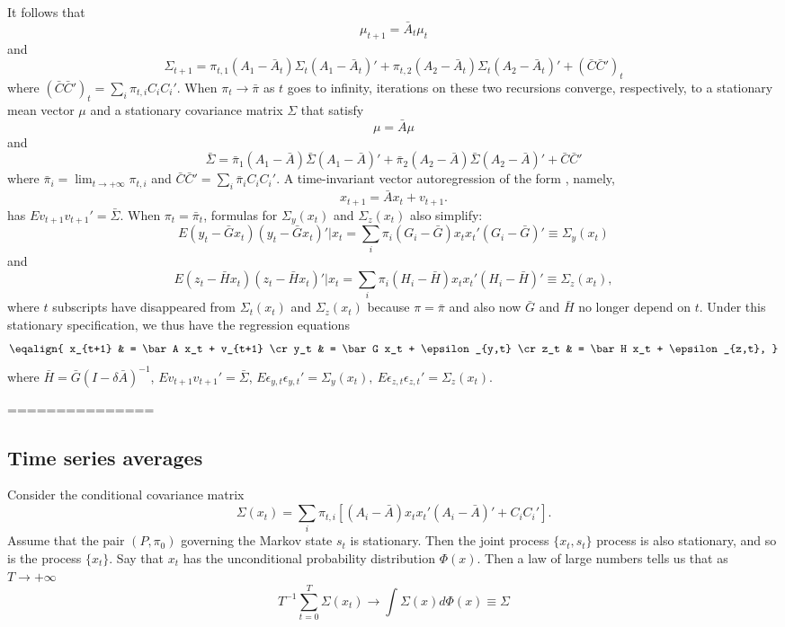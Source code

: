 It follows that
$$ \mu_{t+1} = \bar A_t \mu_t$$
and
$$\Sigma_{t+1} = \pi_{t,1} (A_1 - \bar A_t) \Sigma_t (A_1 - \bar A_t)' + \pi_{t,2} (A_2 - \bar A_t) \Sigma_t (A_2 - \bar A_t)' + (\bar C \bar C')_t  $$
where $(\bar C \bar C')_t = \sum_i \pi_{t,i} C_i C_i' $.
When  $\pi_t \rightarrow \bar \pi$ as $t$ goes to infinity, iterations on these two recursions  converge, respectively, to
a stationary mean vector $\mu$  and a stationary covariance matrix $\Sigma$ that
satisfy
$$ \mu  = \bar A \mu $$
and
$$\bar \Sigma =  \bar \pi_1 (A_1 - \bar A) \bar \Sigma (A_1 - \bar A)' + \bar \pi_2 (A_2 - \bar A) \bar \Sigma(A_2 - \bar A)' + \bar C \bar C' $$
where $\bar \pi_i = \lim_{t \rightarrow +\infty} \pi_{t,i}$ and $\bar C \bar C' = \sum_i \bar \pi_i C_i C_i'$.
A time-invariant vector autoregression of the form , namely,
$$ x_{t+1} = \bar A x_t + v_{t+1} .$$
has $E v_{t+1} v_{t+1}' = \bar \Sigma$.
When $\pi_t = \bar \pi_t$, formulas for $\Sigma_y(x_t)$ and $\Sigma_z(x_t)$ also  simplify: 
$$ E (y_t - \bar G x_t) (y_t - \bar G x_t)' | x_t = \sum_i \pi_{i} 
(G_i - \bar G) x_t x_t' (G_i - \bar G)' \equiv \Sigma_{y}(x_t)   $$
and 
$$ E (z_t - \bar H x_t) (z_t - \bar H x_t)' | x_t = \sum_i \pi_{i} (H_i - \bar H) x_t x_t'
 (H_i - \bar H)' \equiv \Sigma_{z}(x_t),  $$
 where  $t$ subscripts have disappeared from  $ \Sigma_{t}(x_t)$ and $\Sigma_{z}(x_t)$ because 
 $\pi = \bar \pi$  and also now $\bar G$ and $\bar H$ no longer  depend on $t$.
 Under this stationary specification, we thus have the regression equations
 $$\eqalign{ x_{t+1} & = \bar A x_t + v_{t+1} \cr
            y_t & = \bar G x_t + \epsilon_{y,t} \cr 
             z_t & = \bar H x_t + \epsilon_{z,t}, }
$$
where $\bar H = \bar G (I - \delta \bar A)^{-1}$, $E v_{t+1} v_{t+1}'  = \bar \Sigma$,
 $E \epsilon_{y,t} \epsilon_{y,t}' = \Sigma_y(x_t), \ E \epsilon_{z,t} \epsilon_{z,t}' = \Sigma_z(x_t) $.


 ===============


\subsection{Time series averages}
Consider the conditional covariance matrix
$$\Sigma(x_t)  = \sum_i \pi_{t,i} [ (A_i - \bar A) x_t x_t' (A_i - \bar A)' + C_i C_i' ] .$$
Assume that the pair $(P, \pi_0)$ governing the  Markov state $s_t$ is stationary. Then  the joint process $\{x_t, s_t\}$ process is also  stationary,
and so is the  process $\{x_t\}$. Say that $x_t$ has  the unconditional probability distribution $\Phi(x)$.
Then a law of large numbers tells us that as $ {T \rightarrow + \infty}$
$$ T^{-1} \sum_{t=0}^T \Sigma(x_t)  \rightarrow \int \Sigma(x) d \Phi(x) \equiv \Sigma $$


